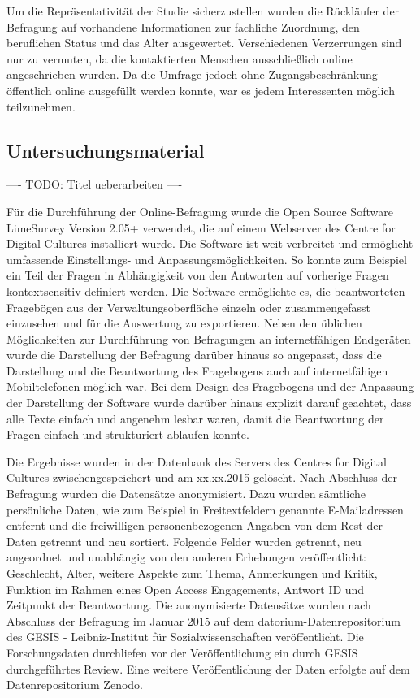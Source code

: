 Um die Repräsentativität der Studie sicherzustellen wurden die Rückläufer der Befragung auf vorhandene Informationen zur fachliche Zuordnung, den beruflichen Status und das Alter ausgewertet. Verschiedenen Verzerrungen sind nur zu vermuten, da die kontaktierten Menschen ausschließlich online angeschrieben wurden. Da die Umfrage jedoch ohne Zugangsbeschränkung öffentlich online ausgefüllt werden konnte, war es jedem Interessenten möglich teilzunehmen.

\subsection{Untersuchungsmaterial}

---- TODO: Titel ueberarbeiten ----

Für die Durchführung der Online-Befragung wurde die Open Source Software LimeSurvey Version 2.05+ verwendet, die auf einem Webserver des Centre for Digital Cultures installiert wurde. Die Software ist weit verbreitet und ermöglicht umfassende Einstellungs- und Anpassungsmöglichkeiten. So konnte zum Beispiel ein Teil der Fragen in Abhängigkeit von den Antworten auf vorherige Fragen kontextsensitiv definiert werden. Die Software ermöglichte es, die beantworteten Fragebögen aus der Verwaltungsoberfläche einzeln oder zusammengefasst einzusehen und für die Auswertung zu exportieren. Neben den üblichen Möglichkeiten zur Durchführung von Befragungen an internetfähigen Endgeräten wurde die Darstellung der Befragung darüber hinaus so angepasst, dass die Darstellung und die Beantwortung des Fragebogens auch auf internetfähigen Mobiltelefonen möglich war. Bei dem Design des Fragebogens und der Anpassung der Darstellung der Software wurde darüber hinaus explizit darauf geachtet, dass alle Texte einfach und angenehm lesbar waren, damit die Beantwortung der Fragen einfach und strukturiert ablaufen konnte.

Die Ergebnisse wurden in der Datenbank des Servers des Centres for Digital Cultures zwischengespeichert und am xx.xx.2015 gelöscht. Nach Abschluss der Befragung wurden die Datensätze anonymisiert. Dazu wurden sämtliche persönliche Daten, wie zum Beispiel in Freitextfeldern genannte E-Mailadressen entfernt und die freiwilligen personenbezogenen Angaben von dem Rest der Daten getrennt und neu sortiert. Folgende Felder wurden getrennt, neu angeordnet und unabhängig von den anderen Erhebungen veröffentlicht: Geschlecht, Alter, weitere Aspekte zum Thema, Anmerkungen und Kritik, Funktion im Rahmen eines Open Access Engagements, Antwort ID und Zeitpunkt der Beantwortung. Die anonymisierte Datensätze wurden nach Abschluss der Befragung im Januar 2015 auf dem datorium-Datenrepositorium des GESIS - Leibniz-Institut für Sozialwissenschaften veröffentlicht. Die Forschungsdaten durchliefen vor der Veröffentlichung ein durch GESIS durchgeführtes Review. Eine weitere Veröffentlichung der Daten erfolgte auf dem Datenrepositorium Zenodo.

